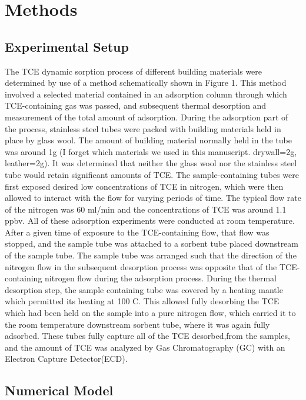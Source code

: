 \section{Methods}\label{sec:methods}


\subsection{Experimental Setup}\label{sec:experiment}
The TCE  dynamic sorption process of different building materials were determined by use of a method schematically shown in Figure 1. 
This method involved a selected material contained in an adsorption column through which TCE-containing gas was passed, and subsequent thermal desorption and measurement of the total amount of adsorption.
During the adsorption part of the process, stainless steel tubes were packed with building materials held in place by glass wool. 
The amount of building material normally held in the tube was around 1g (I forget which materials we used in this manuscript. drywall=2g, leather=2g). 
It was determined that neither the glass wool nor the stainless steel tube would retain significant amounts of TCE. 
The sample-containing tubes were first exposed desired low concentrations of TCE in nitrogen, which were then allowed to interact with the flow for varying periods of time. 
The typical flow rate of the nitrogen was 60 ml/min and the concentrations of TCE was around 1.1 ppbv.
All of these adsorption experiments were conducted at room temperature.
After a given time of exposure to the TCE-containing flow, that flow was stopped, and the sample tube was attached to a sorbent tube placed downstream of the sample tube. 
The sample tube was arranged such that the direction of the nitrogen flow in the subsequent desorption process was opposite that of the TCE-containing nitrogen flow during the adsorption process. 
During the thermal desorption step, the sample containing tube was covered by a heating mantle which permitted its heating at 100 C. 
This allowed fully desorbing the TCE which had been held on the sample into a pure nitrogen flow, which carried it to the room temperature downstream sorbent tube, where it was again fully adsorbed. 
These tubes fully capture all of the TCE desorbed,from the samples, and the amount of TCE was analyzed by Gas Chromatography (GC) with an  Electron Capture Detector(ECD).


\subsection{Numerical Model}\label{sec:model}

